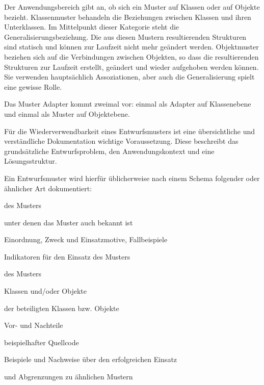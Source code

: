 \vspace{\baselineskip} %

Der Anwendungsbereich gibt an, ob sich ein Muster auf Klassen oder auf Objekte bezieht. Klassenmuster behandeln die Beziehungen zwischen Klassen und ihren Unter\-klassen. Im Mittelpunkt dieser Kategorie steht die Generalisierungsbeziehung. Die aus diesen Mustern resultierenden Strukturen sind statisch und können zur Laufzeit nicht mehr geändert werden. Objektmuster beziehen sich auf die Verbindungen zwischen Objekten, so dass die resultierenden Strukturen zur Laufzeit erstellt, geändert und wieder aufgehoben werden können. Sie verwenden hauptsächlich Assoziationen, aber auch die Generalisierung spielt eine gewisse Rolle.

\vspace{2mm} %

Das Muster Adapter kommt zweimal vor: einmal als Adapter auf Klassenebene und einmal als Muster auf Objektebene.

\vspace{2mm} %

Für die Wiederverwendbarkeit eines Entwurfsmusters ist eine übersichtliche und verständliche Dokumentation wichtige Voraussetzung. Diese beschreibt das grundsätzliche Entwurfsproblem, den Anwendungskontext und eine Lösungsstruktur. 

\clearpage %

Ein Entwurfsmuster wird hierfür üblicherweise nach einem Schema folgender oder ähnlicher Art dokumentiert:

\begin{addmargin}[25pt]{25pt}
\begin{description}
	\setlength{\itemsep}{2mm} %
	
	\item[Zweck] des Musters
	\item[Synonyme,] unter denen das Muster auch bekannt ist
	\item[Motivation] Einordnung, Zweck und Einsatzmotive, Fallbeispiele
	\item[Anwendbarkeit] Indikatoren für den Einsatz des Musters
	\item[Struktur] des Musters
	\item[Beteiligte] Klassen und/oder Objekte
	\item[Zusammenspiel] der beteiligten Klassen bzw. Objekte
	\item[Konsequenzen] Vor- und Nachteile
	\item[Implementierung] beispielhafter Quellcode
	\item[Praxiseinsatz] Beispiele und Nachweise über den erfolgreichen Einsatz
	\item[Querverweise] und Abgrenzungen zu ähnlichen Mustern
\end{description}
\end{addmargin}

